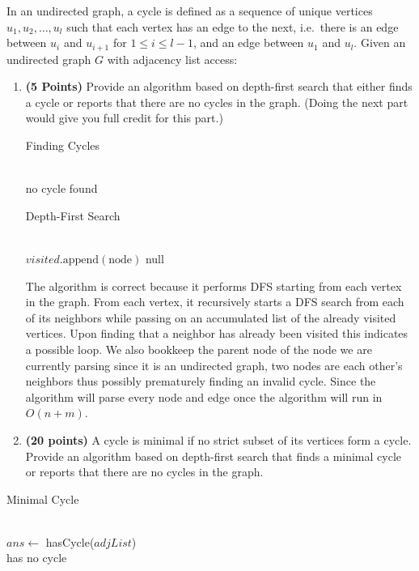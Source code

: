 \documentclass[11pt]{article}
\theoremstyle{definition}
\theoremstyle{theorem}
\begin{document}
 In an undirected graph, a cycle is defined as a sequence of unique vertices
 $u_1, u_2, \ldots, u_l$ such that each vertex has an edge to the next, i.e.\ there is an edge between $u_i$ and $u_{i+1}$ for $1 \leq i \leq l-1$, and an edge between $u_1$ and $u_l$.
 Given an undirected graph $G$ with adjacency list access:
 \begin{enumerate}
     \item \textbf{(5 Points)} Provide an algorithm based on depth-first search that either finds a cycle or reports that there are no cycles in the graph. (Doing the next part would give you full credit for this part.)

\begin{algorithm}[H]
\caption{Finding Cycles}
 \\ {
  \KwRet no cycle found
}
\end{algorithm}

\begin{algorithm}[H]
\caption{Depth-First Search}
 \\ {
    $visited.\text{append}(\text{node})$\;
    \KwRet null
}
\end{algorithm}
The algorithm is correct because it performs DFS starting from each vertex in the graph. From each vertex, it recursively starts a DFS search from each of its neighbors while passing on an accumulated list of the already visited vertices. Upon finding that a neighbor has already been visited this indicates a possible loop. We also bookkeep the parent node of the node we are currently parsing since it is an undirected graph, two nodes are each other's neighbors thus possibly prematurely finding an invalid cycle. Since the algorithm will parse every node and edge once the algorithm will run in $O(n + m)$.
\newpage

     \item \textbf{(20 points)} A cycle is minimal if no strict subset of its vertices form a cycle. Provide an algorithm based on depth-first search that finds a minimal cycle or reports that there are no cycles in the graph.
 \end{enumerate}
\begin{algorithm}[H]
\caption{Minimal Cycle}
 \\ {
    $ans \gets$ hasCycle($adjList$) \\
     {
        \KwRet has no cycle
    }
}
\end{algorithm}
\end{document}
